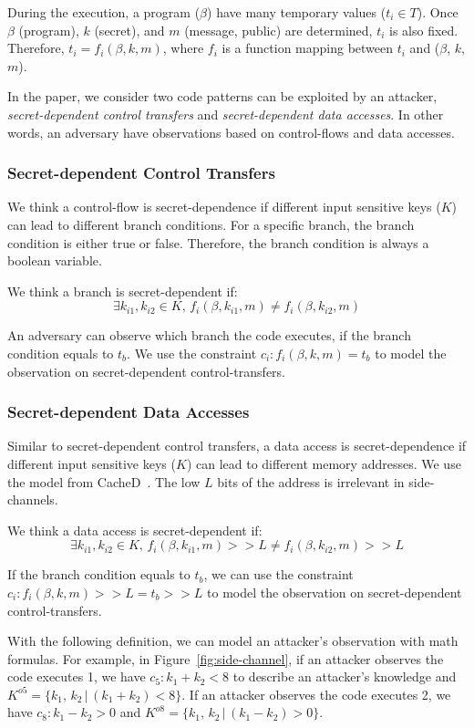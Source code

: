 During the execution, a program ($\beta$) have many temporary values ($t_i \in
T$). Once $\beta$ (program), $k$ (secret), and $m$ (message, public) are
determined, $t_i$ is also fixed. Therefore, $ t_i = f_i(\beta, k, m)$, where $f_
i$ is a function mapping between $t_i$ and ($\beta$, $k$, $m$).

In the paper, we consider two code patterns can be exploited by an attacker,
\emph{secret-dependent control transfers} and \emph{secret-dependent data
accesses}. In other words, an adversary have observations based on control-flows
and data accesses.

\subsubsection{Secret-dependent Control Transfers}
We think a control-flow is secret-dependence if different input sensitive keys
($K$) can lead to different branch conditions. For a specific branch, the branch
condition is either true or false. Therefore, the branch condition is always a
boolean variable.

We think a branch is secret-dependent if:
$$\exists k_{i1}, k_{i2} \in K, \,f_i(\beta, k_{i1}, m) \neq f_i(\beta, k_{i2}, m)$$

An adversary can observe which branch the code executes, if the branch condition
equals to $t_b$. We use the constraint $c_i : f_i(\beta, k, m) = t_b$ to model
the observation on secret-dependent control-transfers.

\subsubsection{Secret-dependent Data Accesses}
Similar to secret-dependent control transfers, a data access is
secret-dependence if different input sensitive keys ($K$) can lead to different
memory addresses. We use the model from CacheD~\cite{203878}. The low $L$ bits
of the address is irrelevant in side-channels.

We think a data access is secret-dependent if:
$$\exists k_{i1}, k_{i2} \in K, \,f_i(\beta, k_{i1}, m) >> L \neq f_i(\beta, k_{i2}, m) >> L$$

If the branch condition equals to $t_b$, we can use the constraint $c_i :
f_i(\beta, k, m) >> L = t_b >> L$ to model the observation on secret-dependent
control-transfers.

With the following definition, we can model an attacker's observation with math
formulas. For example, in Figure~\ref{fig:side-channel}, if an attacker
observes the code executes 1, we have $c_5: k_1 + k_2 < 8$ to describe an
attacker's knowledge and $K^{o5} = \{k_1,\, k_2\,|\, (k_1 + k_2) < 8\}$. If an
attacker observes the code executes 2, we have $c_8: k_1 - k_2 > 0$ and $K^{o8}
= \{k_1,\, k_2\,|\, (k_1 - k_2) > 0\}$.
